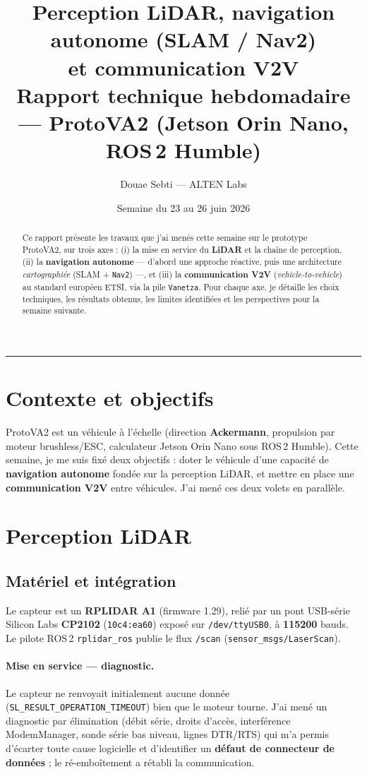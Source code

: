 \documentclass[a4paper,11pt]{article}
\title{\textbf{Perception LiDAR, navigation autonome (SLAM / Nav2)\\ et communication V2V}\\[2mm]
\large Rapport technique hebdomadaire --- ProtoVA2 (Jetson Orin Nano, ROS\,2 Humble)}
\author{Douae Sebti --- ALTEN Labs}
\date{Semaine du 23 au 26 juin 2026}
\begin{document}
\maketitle

\begin{abstract}
\noindent Ce rapport présente les travaux que j'ai menés cette semaine sur le
prototype ProtoVA2, sur trois axes : (i) la mise en service du \textbf{LiDAR} et la
chaîne de perception, (ii) la \textbf{navigation autonome} --- d'abord une approche
réactive, puis une architecture \emph{cartographiée} (SLAM + \texttt{Nav2}) ---, et
(iii) la \textbf{communication V2V} (\emph{vehicle-to-vehicle}) au standard
européen ETSI, via la pile \texttt{Vanetza}. Pour chaque axe, je détaille les choix
techniques, les résultats obtenus, les limites identifiées et les perspectives pour
la semaine suivante.
\end{abstract}

\tableofcontents
\bigskip\hrule

\section{Contexte et objectifs}
ProtoVA2 est un véhicule à l'échelle (direction \textbf{Ackermann}, propulsion par
moteur brushless/ESC, calculateur Jetson Orin Nano sous ROS\,2 Humble). Cette
semaine, je me suis fixé deux objectifs : doter le véhicule d'une capacité de
\textbf{navigation autonome} fondée sur la perception LiDAR, et mettre en place une
\textbf{communication V2V} entre véhicules. J'ai mené ces deux volets en parallèle.

\section{Perception LiDAR}

\subsection{Matériel et intégration}
Le capteur est un \textbf{RPLIDAR A1} (firmware 1.29), relié par un pont USB-série
Silicon Labs \textbf{CP2102} (\texttt{10c4:ea60}) exposé sur \texttt{/dev/ttyUSB0},
à \textbf{115200} bauds. Le pilote ROS\,2 \texttt{rplidar\_ros} publie le flux
\texttt{/scan} (\texttt{sensor\_msgs/LaserScan}).

\paragraph{Mise en service --- diagnostic.} Le capteur ne renvoyait initialement
aucune donnée (\texttt{SL\_RESULT\_OPERATION\_TIMEOUT}) bien que le moteur tourne.
J'ai mené un diagnostic par élimination (débit série, droits d'accès, interférence
ModemManager, sonde série bas niveau, lignes DTR/RTS) qui m'a permis d'écarter
toute cause logicielle et d'identifier un \textbf{défaut de connecteur de données} ;
le ré-emboîtement a rétabli la communication.
\end{document}
